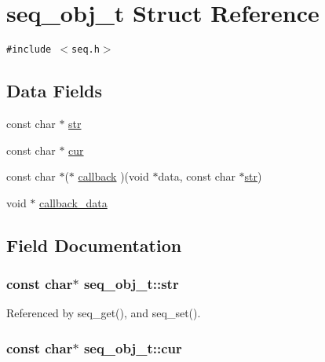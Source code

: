 \hypertarget{structseq__obj__t}{
\section{seq\_\-obj\_\-t Struct Reference}
\label{structseq__obj__t}
}
{\tt \#include $<$seq.h$>$}

\subsection*{Data Fields}
\begin{CompactItemize}
\item 
const char $\ast$ \hyperlink{structseq__obj__t_68aceabb57fd5f5ab9ecaf04dcff8c37}{str}
\item 
const char $\ast$ \hyperlink{structseq__obj__t_b5399c5ad5cb069d233b649891ed143f}{cur}
\item 
const char $\ast$($\ast$ \hyperlink{structseq__obj__t_faae22efa2d91aa7ba307a13660c364d}{callback} )(void $\ast$data, const char $\ast$\hyperlink{structseq__obj__t_68aceabb57fd5f5ab9ecaf04dcff8c37}{str})
\item 
void $\ast$ \hyperlink{structseq__obj__t_b1e63f3a9ccf8bc7fcab55f14e8f595e}{callback\_\-data}
\end{CompactItemize}


\subsection{Field Documentation}
\hypertarget{structseq__obj__t_68aceabb57fd5f5ab9ecaf04dcff8c37}{
\subsubsection{\setlength{\rightskip}{0pt plus 5cm}const char$\ast$ {\bf seq\_\-obj\_\-t::str}}}
\label{structseq__obj__t_68aceabb57fd5f5ab9ecaf04dcff8c37}




Referenced by seq\_\-get(), and seq\_\-set().\hypertarget{structseq__obj__t_b5399c5ad5cb069d233b649891ed143f}{
\subsubsection{\setlength{\rightskip}{0pt plus 5cm}const char$\ast$ {\bf seq\_\-obj\_\-t::cur}}}
\label{structseq__obj__t_b5399c5ad5cb069d233b649891ed143f}




